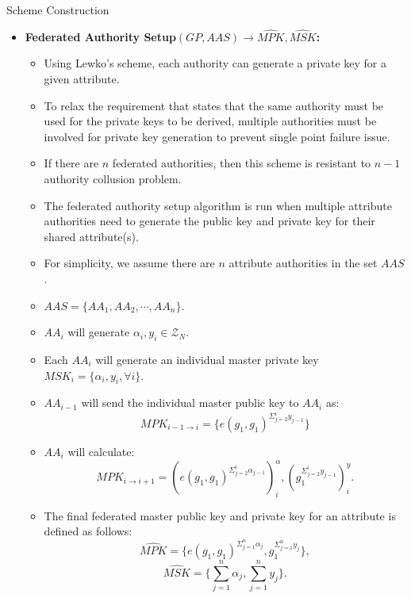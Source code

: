 \documentclass[11pt]{beamer}
\begin{document}
\begin{frame}[allowframebreaks]{Scheme Construction}
\begin{itemize}
\item \textbf{Federated Authority Setup$(GP,AAS)\rightarrow\hat{MPK},\hat{MSK}$:}
	\begin{itemize}
	\item Using Lewko's scheme, each authority can generate a private key for a given attribute.
	\item To relax the requirement that states that the same authority must be used for the private keys to be derived, multiple authorities must be involved for private key generation to prevent single point failure issue.
	\item If there are $n$ federated authorities, then this scheme is resistant to $n - 1$ authority collusion problem.
	\item The federated authority setup algorithm is run when multiple attribute authorities need to generate the public key and private key for their shared attribute(s).
	\item For simplicity, we assume there are $n$ attribute authorities in the set $AAS$.
	\item $AAS = \{AA_1,AA_2,\cdots,AA_n\}$.
	\item $AA_i$ will generate $\alpha_i,y_i \in \mathcal{Z}_N$.
	\item Each $AA_i$ will generate an individual master private key $MSK_i = \{\alpha_i,y_i,\forall i\}$.
	\item $AA_{i-1}$ will send the individual master public key to $AA_i$ as:
	\[MPK_{i - 1\rightarrow i} = \{e(g_1,g_1)^{\Sigma_{j = 2}^i y_{j - 1}}\}\]
	\item $AA_i$ will calculate:
	\[MPK_{i\rightarrow i+1} = (e(g_1,g_1)^{\Sigma_{j = 2} ^ i \alpha_{j - 1 }})^\alpha_i, (g_1^{\Sigma_{j = 2}^i y_{j - 1}})^y_i.\]
	\item The final federated master public key and private key for an attribute is defined as follows:
	\[\hat{MPK} = \{e(g_1,g_1)^{\Sigma_{j = 1}^n \alpha_j}, g_1^{\Sigma_{j = 1}^n y_j}\},\]
	\[\hat{MSK} = \{\sum_{j=1}^n \alpha_j, \sum_{j = 1}^n y_j\}.\]
	\end{itemize}


\end{itemize}
\end{frame}
\end{document}
